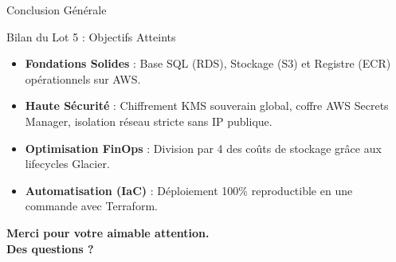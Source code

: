 \documentclass{beamer}
\begin{document}
\begin{frame}{Conclusion Générale}
    \begin{block}{\small Bilan du Lot 5 : Objectifs Atteints}
        \scriptsize
        \begin{itemize}
            \item \textbf{Fondations Solides} : Base SQL (RDS), Stockage (S3) et Registre (ECR) opérationnels sur AWS.
            \item \textbf{Haute Sécurité} : Chiffrement KMS souverain global, coffre AWS Secrets Manager, isolation réseau stricte sans IP publique.
            \item \textbf{Optimisation FinOps} : Division par 4 des coûts de stockage grâce aux lifecycles Glacier.
            \item \textbf{Automatisation (IaC)} : Déploiement 100\% reproductible en une commande avec Terraform.
        \end{itemize}
    \end{block}
    
    \vspace*{0.3cm}
    \centering
    \small\bfseries Merci pour votre aimable attention. \\ Des questions ?
\end{frame}
\end{document}

